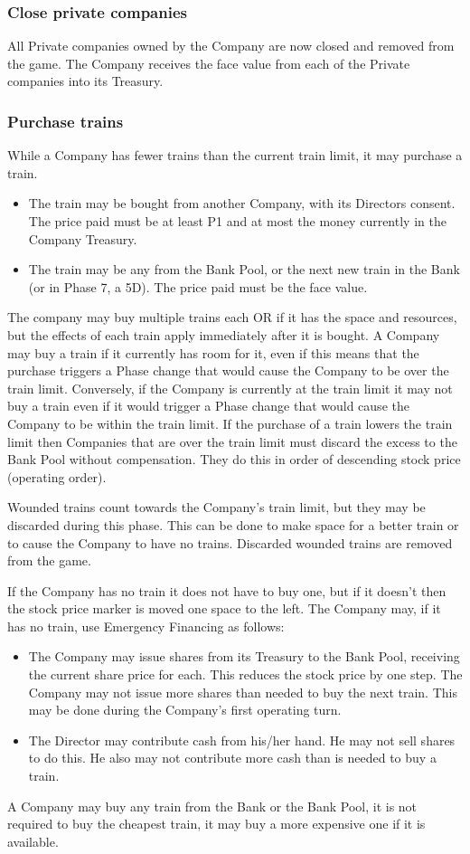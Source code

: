 \documentclass[a4paper,twocolumn]{article}
\begin{document}
\subsubsection{Close private companies}
All Private companies owned by the Company are now closed and removed from the
game. The Company receives the face value from each of the Private companies
into its Treasury.

\subsubsection{Purchase trains}
While a Company has fewer trains than the current train limit, it may purchase a
train.
\begin{itemize}
	\item The train may be bought from another Company, with its Directors
	consent. The price paid must be at least P1 and at most the money currently
	in the Company Treasury.
	\item The train may be any from the Bank Pool, or the next new train in the
	Bank (or in Phase 7, a 5D). The price paid must be the face value.
\end{itemize}
The company may buy multiple trains each OR if it has the space and resources,
but the effects of each train apply immediately after it is bought. A Company
may buy a train if it currently has room for it, even if this means that the
purchase triggers a Phase change that would cause the Company to be over the
train limit. Conversely, if the Company is currently at the train limit it may
not buy a train even if it would trigger a Phase change that would cause the
Company to be within the train limit. If the purchase of a train lowers the
train limit then Companies that are over the train limit must discard the
excess to the Bank Pool without compensation. They do this in order of
descending stock price (operating order).

Wounded trains count towards the Company's train limit, but they  may be
discarded during this phase. This can be done to make space for a better train
or to cause the Company to have no trains. Discarded wounded trains are removed
from the game.

If the Company has no train it does not have to buy one, but if it doesn't then
the stock price marker is moved one space to the left. The Company may, if it
has no train, use Emergency Financing as follows:
\begin{itemize}
	\item The Company may issue shares from its Treasury to the Bank Pool,
	receiving the current share price for each. This reduces the stock price by
	one step. The Company may not issue more shares than needed to buy the next
	train. This may be done during the Company's first operating turn.
	\item The Director may contribute cash from his/her hand. He may not sell
	shares to do this. He also may not contribute more cash than is needed to
	buy a train.
\end{itemize}
A Company may buy any train from the Bank or the Bank Pool, it is not required
to buy the cheapest train, it may buy a more expensive one if it is available.
\end{document}
